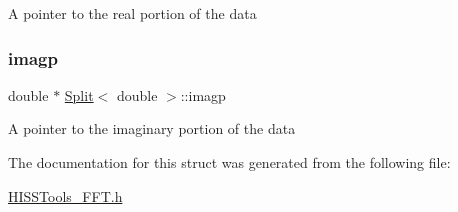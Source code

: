 A pointer to the real portion of the data \mbox{\label{struct_split_a21ff23a96abee0c0ed6a2433798c4eac}} 
\subsubsection{\texorpdfstring{imagp}{imagp}}
{\footnotesize\ttfamily double $\ast$ \hyperlink{struct_split}{Split}$<$ double  $>$\+::imagp\hspace{0.3cm}{\ttfamily [inherited]}}

A pointer to the imaginary portion of the data 

The documentation for this struct was generated from the following file\+:\begin{DoxyCompactItemize}
\item 
\hyperlink{_h_i_s_s_tools___f_f_t_8h}{H\+I\+S\+S\+Tools\+\_\+\+F\+F\+T.\+h}\end{DoxyCompactItemize}
